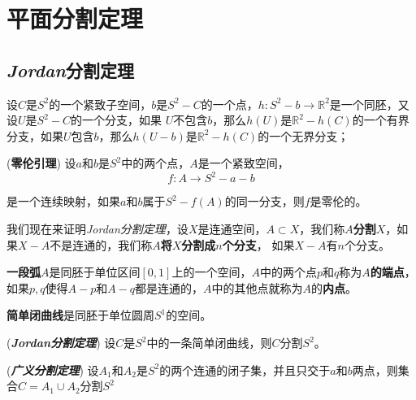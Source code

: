 \chapter{平面分割定理}

\section{\textsl{Jordan}分割定理}

\begin{mdframed}
    \begin{lemma}
        设$C$是$S^2$的一个紧致子空间，$b$是$S^2-C$的一个点，$h:S^2-b\rightarrow \mathbb{R}^2$是一个同胚，又设$U$是$S^2-C$的一个分支，如果
        $U$不包含$b$，那么$h(U)$是$\mathbb{R}^2-h(C)$的一个有界分支，如果$U$包含$b$，那么$h(U-b)$是$\mathbb{R}^2-h(C)$的一个无界分支；
    \end{lemma}
\end{mdframed}

\begin{mdframed}
    \begin{lemma}
        (\textbf{零伦引理}) 设$a$和$b$是$S^2$中的两个点，$A$是一个紧致空间，
        \begin{equation}
            f:A\rightarrow S^2-a-b
        \end{equation}

        是一个连续映射，如果$a$和$b$属于$S^2-f(A)$的同一分支，则$f$是零伦的。
    \end{lemma}
\end{mdframed}

我们现在来证明\textsl{Jordan分割定理}，设$X$是连通空间，$A\subset X$，我们称\textbf{$A$分割$X$}，如果$X-A$不是连通的，我们称\textbf{$A$将$X$分割成$n$个分支}，
如果$X-A$有$n$个分支。

\textbf{一段弧}$A$是同胚于单位区间$[0,1]$上的一个空间，$A$中的两个点$p$和$q$称为\textbf{$A$的端点}，如果$p,q$使得$A-p$和$A-q$都是连通的，$A$中的其他点就称为$A$的\textbf{内点}。

\textbf{简单闭曲线}是同胚于单位圆周$S^1$的空间。

\begin{mdframed}
        \begin{theorem}
            (\textbf{\textsl{Jordan分割定理}}) 设$C$是$S^2$中的一条简单闭曲线，则$C$分割$S^2$。
        \end{theorem}
\end{mdframed}

\begin{mdframed}
    \begin{theorem}
        (\textbf{\textsl{广义分割定理}}) 设$A_1$和$A_2$是$S^2$的两个连通的闭子集，并且只交于$a$和$b$两点，则集合$C=A_1\cup A_2$分割$S^2$
    \end{theorem}
\end{mdframed}


